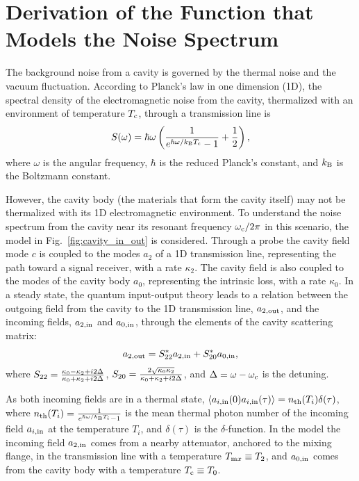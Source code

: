 \documentclass[%
reprint, %
superscriptaddress,
 amsmath,amssymb,
 aps
]{revtex4-2}
\begin{document}
\appendix
\section{Derivation of the Function that Models the Noise Spectrum} 
\label{sec:cavitynoise}

The background noise from a cavity is governed by the thermal noise and the 
vacuum fluctuation. 
According to Planck's law in one dimension (1D), the spectral density of 
the electromagnetic noise from the cavity, thermalized with an environment of 
temperature $T_{\rm c}$, through a transmission line is 
\begin{equation}
\label{eq:cavity_thermal_spectral_density}
    S(\omega) = \hbar\omega \left( \frac{1}{e^{\hbar\omega/k_{\rm B}T_{\rm c}} - 1} +\frac{1}{2} \right),
\end{equation}
where $\omega$ is the angular frequency, $\hbar$ is the reduced Planck's 
constant, and $k_{\rm B}$ is the Boltzmann constant. 


However, the cavity body (the materials that form the cavity itself) may not 
be thermalized with its 1D electromagnetic environment. To understand the 
noise spectrum from the cavity near its 
resonant frequency $\omega_{\rm c}/2\pi$ in this scenario, the model in 
Fig.~\ref{fig:cavity_in_out} is considered. Through a probe the cavity field 
mode $c$ is coupled to the modes $a_2$ of a 1D transmission line, representing
 the path toward a signal receiver, with a rate $\kappa_2$. The cavity field 
is also coupled to the modes of the cavity body $a_0$, representing the 
intrinsic loss, with a rate $\kappa_0$. In a steady state, 
the quantum input-output theory leads to a relation between the outgoing field 
from the cavity to the 1D transmission line, $a_{\rm 2,out}$, and the incoming
 fields, $a_{\rm 2,in}$ and $a_{\rm 0,in}$, through the elements of the 
cavity scattering matrix:
\begin{equation} \label{eq:outgoing_field}
	 a_{\rm 2,out} = S^{*}_{\rm 22} a_{\rm 2,in} + S^{*}_{\rm 20} a_{\rm 0,in},
\end{equation}
where $S_{\rm 22} = \frac {\kappa_0 - \kappa_{\rm 2} + i 2 \Delta} {\kappa_0+\kappa_{\rm 2} + i 2 \Delta}$, $S_{\rm 20} = \frac {2\sqrt{\kappa_0 \kappa_{\rm 2}}} {\kappa_0+\kappa_{\rm 2} + i 2 \Delta}$,
and $\Delta = \omega-\omega_{\rm c}$ is the detuning. 

As both incoming fields are in a thermal state, $\langle a_{i,\rm in}(0) a_{i,\rm in}(\tau) \rangle = n_{\rm th}(T_i) \delta(\tau)$, where $n_{\rm th}(T_i) = \frac{1}{e^{\hbar\omega/k_{\rm B}T_i} - 1}$ is the mean thermal photon number 
of the incoming field $a_{i,\rm in}$ at the temperature $T_i$, and 
$\delta(\tau)$ is the $\delta$-function. In the model the incoming field 
$a_{\rm 2,in}$ comes from a nearby attenuator, anchored to the mixing flange, 
in the transmission line 
with a temperature $T_{\text mx} \equiv T_{\rm 2}$, and $a_{\rm 0,in}$ comes 
from the cavity body with a temperature $T_{\text c} \equiv T_{\rm 0}$.
\end{document}
